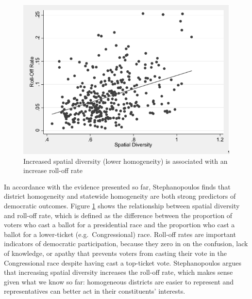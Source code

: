 \documentclass[]{article}
\begin{document}
\begin{figure}
\centering
\includegraphics{img/sd_rolloff.png}
\caption{Increased spatial diversity (lower homogeneity) is associated
with an increase roll-off rate \label{sd_rolloff}}
\end{figure}

In accordance with the evidence presented so far, Stephanopoulos finds
that district homogeneity and statewide homogeneity are both strong
predictors of democratic outcomes. Figure \ref{sd_rolloff} shows the
relationship between spatial diversity and roll-off rate, which is
defined as the difference between the proportion of voters who cast a
ballot for a presidential race and the proportion who cast a ballot for
a lower-ticket (e.g.~Congressional) race. Roll-off rates are important
indicators of democratic participation, because they zero in on the
confusion, lack of knowledge, or apathy that prevents voters from
casting their vote in the Congressional race despite having cast a
top-ticket vote. Stephanopoulos argues that increasing spatial diversity
increases the roll-off rate, which makes sense given what we know so
far: homogeneous districts are easier to represent and representatives
can better act in their constituents' interests.
\end{document}
